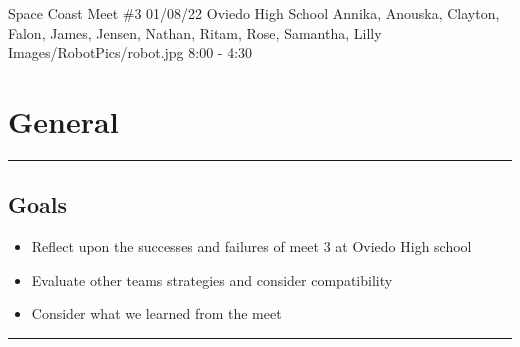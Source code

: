 \insertmeeting 
	{Space Coast Meet \#3} 
	{01/08/22}
	{Oviedo High School}
	{Annika, Anouska, Clayton, Falon, James, Jensen, Nathan, Ritam, Rose, Samantha, Lilly}
	{Images/RobotPics/robot.jpg}
	{8:00 - 4:30}
	
\section*{General}
\noindent\hfil\rule{\textwidth}{.4pt}\hfil
\subsection*{Goals}
\begin{itemize}
    \item Reflect upon the successes and failures of meet 3 at Oviedo High school 
    \item Evaluate other teams strategies and consider compatibility
    \item Consider what we learned from the meet 

\end{itemize} 

\noindent\hfil\rule{\textwidth}{.4pt}\hfil

